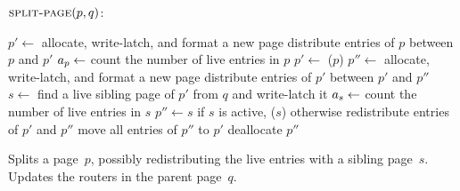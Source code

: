 \begin{algorithm}[htb]
$\proc{split-page}(p, q)$:

\begin{algorithmic}[1]
  \STATE $p' \gets$ allocate, write-latch, and format a new
  page 
  \STATE distribute entries of $p$ between $p$ and $p'$
  \STATE $a_{p} \gets$ count the number of live entries in $p$
  \STATE $p' \gets$ ($p$)
    \STATE $p'' \gets$ allocate, write-latch, and format a new page 
    \STATE distribute entries of $p'$ between $p'$ and $p''$
    \STATE $s \gets$ find a live sibling page of $p'$ from $q$ and
    write-latch it
    \STATE $a_{s} \gets$ count the number of live entries in $s$
    \STATE $p'' \gets s$ if $s$ is active, ($s$)
    otherwise
      \STATE redistribute entries of $p'$ and $p''$ 
      \STATE move all entries of $p''$ to $p'$
      \STATE deallocate $p''$
    \ENDIF
    \STATE {}
  \ENDIF
\ENDIF
\end{algorithmic}
%
{Splits a page~$p$, possibly redistributing the live entries with a sibling
page~$s$. 
Updates the routers in the parent page~$q$.}
\label{alg:split}
\end{algorithm}

